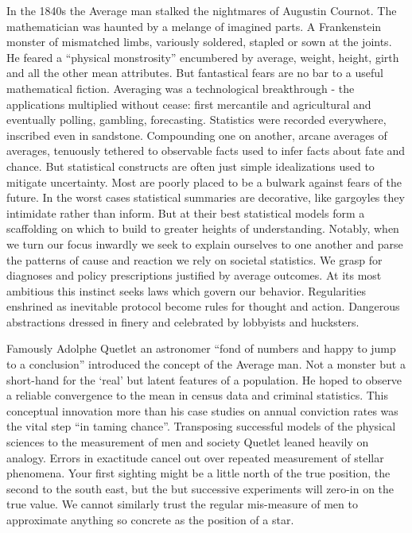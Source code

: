 \documentclass[]{tufte-book}
\theoremstyle{definition}
\theoremstyle{definition}
\theoremstyle{definition}
\theoremstyle{remark}
\begin{document}
In the 1840s the Average man stalked the nightmares of Augustin Cournot. The mathematician was haunted by a melange of imagined parts. A Frankenstein monster of mismatched limbs, variously soldered, stapled or sown at the joints. He feared a ``physical monstrosity'' encumbered by average, weight, height, girth and all the other mean attributes. \citep{stigler2016seven} But fantastical fears are no bar to a useful mathematical fiction. Averaging was a technological breakthrough - the applications multiplied without cease: first mercantile and agricultural and eventually polling, gambling, forecasting. Statistics were recorded everywhere, inscribed even in sandstone. Compounding one on another, arcane averages of averages, tenuously tethered to observable facts used to infer facts about fate and chance. But statistical constructs are often just simple idealizations used to mitigate uncertainty. Most are poorly placed to be a bulwark against fears of the future. In the worst cases statistical summaries are decorative, like gargoyles they intimidate rather than inform. But at their best statistical models form a scaffolding on which to build to greater heights of understanding. Notably, when we turn our focus inwardly we seek to explain ourselves to one another and parse the patterns of cause and reaction we rely on societal statistics. We grasp for diagnoses and policy prescriptions justified by average outcomes. At its most ambitious this instinct seeks laws which govern our behavior. Regularities enshrined as inevitable protocol become rules for thought and action. Dangerous abstractions dressed in finery and celebrated by lobbyists and hucksters.

Famously Adolphe Quetlet an astronomer ``fond of numbers and happy to jump to a conclusion'' introduced the concept of the Average man. Not a monster but a short-hand for the `real' but latent features of a population. He hoped to observe a reliable convergence to the mean in census data and criminal statistics. This conceptual innovation more than his case studies on annual conviction rates was the vital step ``in taming chance''\citep{HackingTaming}. Transposing successful models of the physical sciences to the measurement of men and society Quetlet leaned heavily on analogy. Errors in exactitude cancel out over repeated measurement of stellar phenomena. Your first sighting might be a little north of the true position, the second to the south east, but the but successive experiments will zero-in on the true value. We cannot similarly trust the regular mis-measure of men to approximate anything so concrete as the position of a star.
\end{document}
